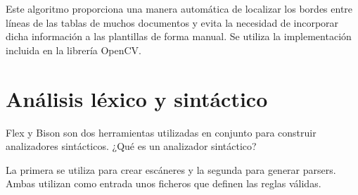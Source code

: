 Este algoritmo proporciona una manera automática de localizar los bordes entre líneas de las tablas de muchos documentos y evita la necesidad de incorporar dicha información a las plantillas de forma manual. Se utiliza la implementación incluida en la librería OpenCV.

\section{Análisis léxico y sintáctico}

Flex y Bison son dos herramientas utilizadas en conjunto para construir analizadores sintácticos. ¿Qué es un analizador sintáctico?

La primera se utiliza para crear escáneres y la segunda para generar parsers. Ambas utilizan como entrada unos ficheros que definen las reglas válidas.
